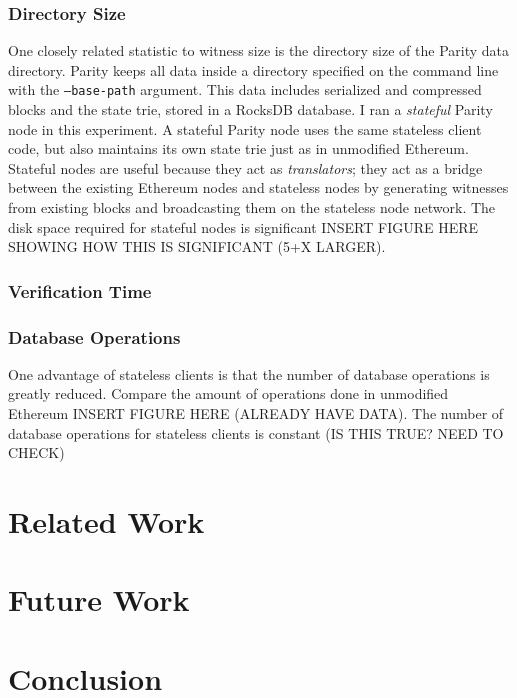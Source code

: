 \documentclass[12pt]{article}
\begin{document}
\subsubsection{Directory Size}

One closely related statistic to witness size is the directory size of the Parity data directory. Parity keeps all data inside a directory specified on the command line with the \texttt{--base-path} argument. This data includes serialized and compressed blocks and the state trie, stored in a RocksDB database. I ran a \emph{stateful} Parity node in this experiment. A stateful Parity node uses the same stateless client code, but also maintains its own state trie just as in unmodified Ethereum. Stateful nodes are useful because they act as \emph{translators}; they act as a bridge between the existing Ethereum nodes and stateless nodes by generating witnesses from existing blocks and broadcasting them on the stateless node network. The disk space required for stateful nodes is significant INSERT FIGURE HERE SHOWING HOW THIS IS SIGNIFICANT (5+X LARGER).

\subsubsection{Verification Time}

\subsubsection{Database Operations}

One advantage of stateless clients is that the number of database operations is greatly reduced. Compare the amount of operations done in unmodified Ethereum INSERT FIGURE HERE (ALREADY HAVE DATA). The number of database operations for stateless clients is constant (IS THIS TRUE? NEED TO CHECK)

\section{Related Work}

\section{Future Work}

\section{Conclusion}
\end{document}
